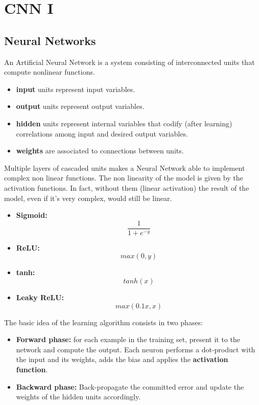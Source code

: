\chapter{CNN I}
\section{Neural Networks}
An Artificial Neural Network is a system consisting of interconnected units that compute nonlinear functions.
\begin{itemize}
    \item \textbf{input} units represent input variables.
    \item \textbf{output} units represent output variables.
    \item \textbf{hidden} units represent internal variables that codify (after learning) correlations among input and desired output variables.
    \item \textbf{weights} are associated to connections between units.
\end{itemize}
Multiple layers of cascaded units makes a Neural Network able to implement complex non linear functions. The non linearity of the model is given by the activation functions. In fact, without them (linear activation) the result of the model, even if it’s very complex, would still be linear.
\begin{itemize}
    \item \textbf{Sigmoid:}
    \[\frac{1}{1 + e^{-y}}\]

    \item \textbf{ReLU:}
    \[max(0, y)\]
    
    \item \textbf{tanh:}
    \[tanh(x)\]

    \item \textbf{Leaky ReLU:}
    \[max(0.1x, x)\]
\end{itemize}
The basic idea of the learning algorithm consists in two phases:
\begin{itemize}
    \item \textbf{Forward phase:} for each example in the training set, present it to the network and compute the output. Each neuron performs a dot-product with the input and its weights, adds the bias and applies the \textbf{activation function}.
    
    \item \textbf{Backward phase:} Back-propagate the committed error and update the weights of the hidden units accordingly. 
\end{itemize}
